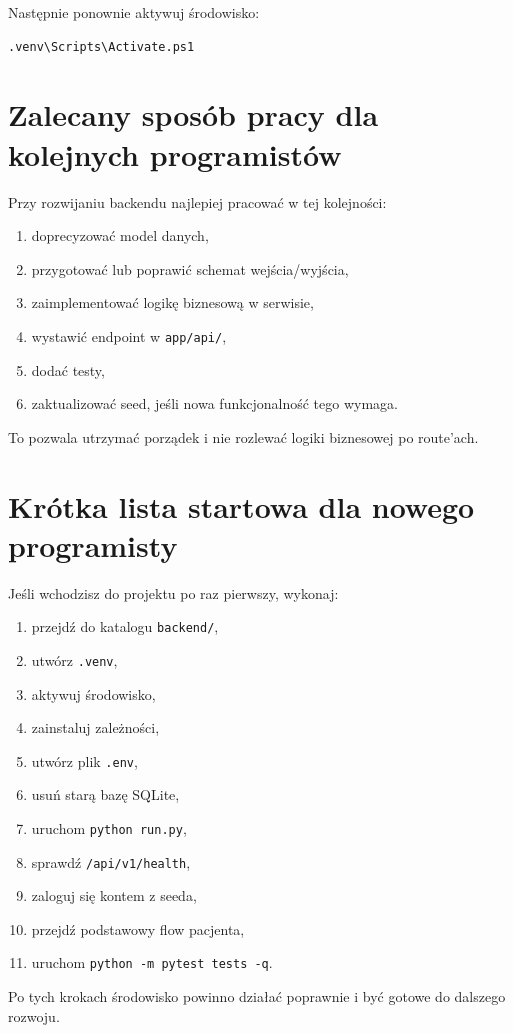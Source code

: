 \documentclass[11pt,a4paper]{article}
\begin{document}
Następnie ponownie aktywuj środowisko:

\begin{lstlisting}
.venv\Scripts\Activate.ps1
\end{lstlisting}

\section{Zalecany sposób pracy dla kolejnych programistów}

Przy rozwijaniu backendu najlepiej pracować w tej kolejności:

\begin{enumerate}[leftmargin=1.2cm]
    \item doprecyzować model danych,
    \item przygotować lub poprawić schemat wejścia/wyjścia,
    \item zaimplementować logikę biznesową w serwisie,
    \item wystawić endpoint w \texttt{app/api/},
    \item dodać testy,
    \item zaktualizować seed, jeśli nowa funkcjonalność tego wymaga.
\end{enumerate}

To pozwala utrzymać porządek i nie rozlewać logiki biznesowej po route'ach.

\section{Krótka lista startowa dla nowego programisty}

Jeśli wchodzisz do projektu po raz pierwszy, wykonaj:

\begin{enumerate}[leftmargin=1.2cm]
    \item przejdź do katalogu \texttt{backend/},
    \item utwórz \texttt{.venv},
    \item aktywuj środowisko,
    \item zainstaluj zależności,
    \item utwórz plik \texttt{.env},
    \item usuń starą bazę SQLite,
    \item uruchom \texttt{python run.py},
    \item sprawdź \texttt{/api/v1/health},
    \item zaloguj się kontem z seeda,
    \item przejdź podstawowy flow pacjenta,
    \item uruchom \texttt{python -m pytest tests -q}.
\end{enumerate}

Po tych krokach środowisko powinno działać poprawnie i być gotowe do dalszego rozwoju.
\end{document}
